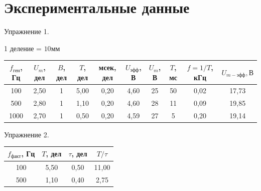 \documentclass[12pt]{article}
\begin{document}
\section*{Экспериментальные данные}
\begin{table}[h!]
\begin{center}
 Упражнение 1.

1 деление = $10мм$

\begin{tabular}{|c|c|c|c|c|c|c|c|c|c|}
\hline
$f_{ген}$, Гц & $U_{m}$, дел & $B$, дел & $T$, дел & мсек, дел & $U_{эфф}$, В & $U_{m}$, В & $T$, мс & $f=1/T$, кГц & $U_{m-эфф}, В$  \\
\hline
100 & 2,50 & 1 & 5,00 & 0,20 & 4,60 & 25 & 50 & 0,02 & 17,73\\
\hline
500 & 2,80 & 1 & 1,10 & 0,20 & 4,60 & 28 & 11 & 0,09 & 19,85\\
\hline
1000 & 2,70 & 1 & 0,50 & 0,20 & 4,59 & 27 & 5 & 0,20 & 19,14\\
\hline
\end{tabular}
\end{center}
\end{table}
\begin{table}[h!]
\begin{center}
 Упражнение 2.

\begin{tabular}{|c|c|c|c|}
\hline
$f_{факт}$, Гц & $T$, дел & $\tau$, дел & $T/\tau$\\
\hline
100 & 5,50 & 0,50 & 11,00 \\
\hline
500 & 1,10 & 0,40 & 2,75\\
\hline
\end{tabular}
\end{center}
\end{table}
\end{document}
